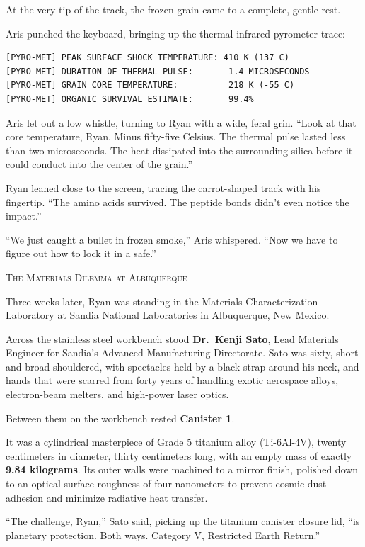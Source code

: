 \documentclass[12pt,twoside,openright]{book}
\newcommand{\sceneheader}[1]{%
  \par\vspace{1.8em}%
  {\noindent\centering\scshape\large #1\par}%
  \vspace{1.0em}%
  \noindent%
}
\newcommand{\dinkus}{%
  \par\vspace{1.2em}%
  {\noindent\centering{\large $\ast\quad\ast\quad\ast$}\par}%
  \vspace{1.2em}%
  \noindent%
}
\begin{document}
At the very tip of the track, the frozen grain came to a complete,
gentle rest.

Aris punched the keyboard, bringing up the thermal infrared pyrometer
trace:

\begin{lstlisting}
[PYRO-MET] PEAK SURFACE SHOCK TEMPERATURE: 410 K (137 C)
[PYRO-MET] DURATION OF THERMAL PULSE:       1.4 MICROSECONDS
[PYRO-MET] GRAIN CORE TEMPERATURE:          218 K (-55 C)
[PYRO-MET] ORGANIC SURVIVAL ESTIMATE:       99.4%
\end{lstlisting}

Aris let out a low whistle, turning to Ryan with a wide, feral grin.
``Look at that core temperature, Ryan. Minus fifty-five Celsius. The
thermal pulse lasted less than two microseconds. The heat dissipated
into the surrounding silica before it could conduct into the center of
the grain.''

Ryan leaned close to the screen, tracing the carrot-shaped track with
his fingertip. ``The amino acids survived. The peptide bonds didn't even
notice the impact.''

``We just caught a bullet in frozen smoke,'' Aris whispered. ``Now we
have to figure out how to lock it in a safe.''

\dinkus

\sceneheader{The Materials Dilemma at
Albuquerque}

Three weeks later, Ryan was standing in the Materials Characterization
Laboratory at Sandia National Laboratories in Albuquerque, New Mexico.

Across the stainless steel workbench stood \textbf{Dr.~Kenji Sato}, Lead
Materials Engineer for Sandia's Advanced Manufacturing Directorate. Sato
was sixty, short and broad-shouldered, with spectacles held by a black
strap around his neck, and hands that were scarred from forty years of
handling exotic aerospace alloys, electron-beam melters, and high-power
laser optics.

Between them on the workbench rested \textbf{Canister 1}.

It was a cylindrical masterpiece of Grade 5 titanium alloy (Ti-6Al-4V),
twenty centimeters in diameter, thirty centimeters long, with an empty
mass of exactly \textbf{9.84 kilograms}. Its outer walls were machined
to a mirror finish, polished down to an optical surface roughness of
four nanometers to prevent cosmic dust adhesion and minimize radiative
heat transfer.

``The challenge, Ryan,'' Sato said, picking up the titanium canister
closure lid, ``is planetary protection. Both ways. Category V,
Restricted Earth Return.''
\end{document}
